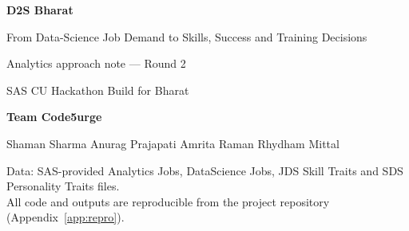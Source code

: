 \documentclass[12pt,a4paper]{article}
\begin{document}
\begin{titlepage}
  \centering
  \vspace*{3cm}
  {\Huge\bfseries\color{sasblue} D2S Bharat\par}
  \vspace{0.4cm}
  {\Large From Data-Science Job Demand to Skills, Success and Training Decisions\par}
  \vspace{1.2cm}
  {\large Analytics approach note --- Round 2\par}
  {\large SAS CU Hackathon \textperiodcentered{} Build for Bharat\par}
  \vspace{2cm}
  {\large\bfseries Team Code5urge\par}
  \vspace{0.3cm}
  {\large Shaman Sharma \quad Anurag Prajapati \quad Amrita Raman \quad Rhydham Mittal\par}
  \vfill
  {\small Data: SAS-provided Analytics Jobs, DataScience Jobs, JDS Skill Traits and SDS Personality Traits files.\\
  All code and outputs are reproducible from the project repository (Appendix~\ref{app:repro}).\par}
\end{titlepage}

\tableofcontents
\clearpage
{}











\clearpage



\clearpage
\appendix

\end{document}
